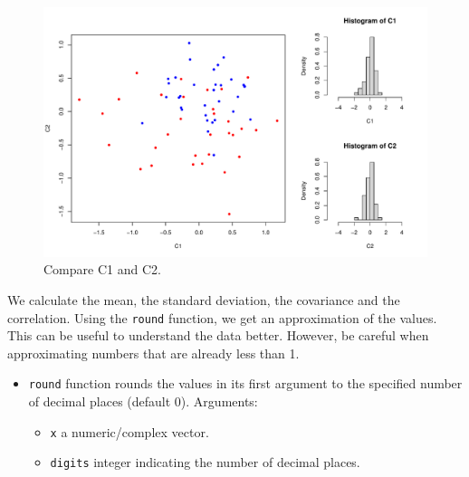 \documentclass[a4paper]{article}
\begin{document}
    \begin{figure}[!htp]
        \centering
        \includegraphics[width=\textwidth]{img/visualization-of-multivariate-data-8.pdf}
        \caption*{Compare C1 and C2.}
    \end{figure}

    \newpage

    \noindent
    We calculate the mean, the standard deviation, the covariance and the correlation. Using the \texttt{round} function, we get an approximation of the values. This can be useful to understand the data better. However, be careful when approximating numbers that are already less than 1.
    \begin{itemize}
        \item \texttt{round} function rounds the values in its first argument to the specified number of decimal places (default 0). Arguments:
        \begin{itemize}
            \item \texttt{x} a numeric/complex vector.
            \item \texttt{digits} integer indicating the number of decimal places.
        \end{itemize}
    \end{itemize}
    

    \newpage
\end{document}
